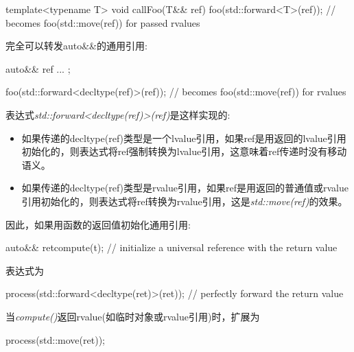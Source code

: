 \begin{cppcode}
template<typename T>
void callFoo(T&& ref) {
	foo(std::forward<T>(ref)); // becomes foo(std::move(ref)) for passed rvalues
}
\end{cppcode}

完全可以转发auto\&\&的通用引用:

\begin{cppcode}
auto&& ref{ ... };

foo(std::forward<decltype(ref)>(ref)); // becomes foo(std::move(ref)) for rvalues
\end{cppcode}

表达式\textit{std::forward<decltype(ref)>(ref)}是这样实现的:

\begin{itemize}
	\item 如果传递的decltype(ref)类型是一个lvalue引用，如果ref是用返回的lvalue引用初始化的，则表达式将ref强制转换为lvalue引用，这意味着ref传递时没有移动语义。
	\item 如果传递的decltype(ref)类型是rvalue引用，如果ref是用返回的普通值或rvalue引用初始化的，则表达式将ref转换为rvalue引用，这是\textit{std::move(ref)}的效果。
\end{itemize}

因此，如果用函数的返回值初始化通用引用:

\begin{cppcode}
auto&& ret{compute(t)}; // initialize a universal reference with the return value
\end{cppcode}

表达式为

\begin{cppcode}
process(std::forward<decltype(ret)>(ret)); // perfectly forward the return value
\end{cppcode}

当\textit{compute()}返回rvalue(如临时对象或rvalue引用)时，扩展为

\begin{cppcode}
process(std::move(ret));
\end{cppcode}
























